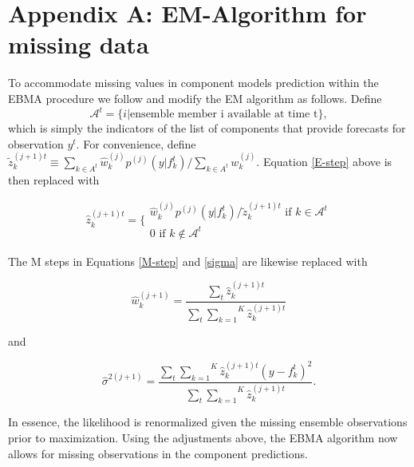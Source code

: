 \documentclass[12pt,fullpage,endnotes]{article}
\begin{document}
 \section*{Appendix A: EM-Algorithm for missing data}

To accommodate missing values in component models prediction within
the EBMA procedure we follow \citet{Fraley:2010} and modify the EM
algorithm as follows.  Define $$\mathcal{A}^t = \{i|\mbox{ensemble
  member i available at time t}\},$$\noindent which is simply the
indicators of the list of components that provide forecasts for
observation $y^t$.  For convenience, define $\tilde{z}_k^{(j+1)t}
\equiv {{\underset{k \in
      A^t}{\sum}}\hat{w}^{(j)}_kp^{(j)}(y|f_{k}^{t})}/{\underset{k \in
    A^t}\sum w_k^{(j)}}$.  Equation \ref{E-step} above is then
replaced with

\begin{equation}
\hat{z}^{(j+1)t}_{k} = \Bigg\{ \begin{array}{c} {\hat{w}^{(j)}_k p^{(j)}(y|f_{k}^{t})}/{\tilde{z}_k^{(j+1)t} } \mbox{ if } k \in \mathcal{A}^t\\ 0 \mbox{ if } k \notin \mathcal{A}^t \end{array}
\end{equation}



\noindent  The M steps in Equations \ref{M-step} and \ref{sigma} are likewise replaced with

\begin{equation}
\hat{w}^{(j+1)}_k=\frac{\underset{t}{\sum}\hat{z}^{(j+1)t}_{k}}{\underset{t}{\sum}\overset{K}{\underset{k=1}{ \sum}} \hat{z}_k^{(j+1)t}}
\end{equation}


\noindent and

\begin{equation}
\hat{\sigma}^{2(j+1)}=\frac{\underset{t}{\sum}\overset{K}{\underset{k=1}{\sum}}\hat{z}^{(j+1)t}_{k}(y-f_{k}^{t})^2 }{\underset{t}{\sum}\overset{K}{\underset{k=1}{ \sum}} \hat{z}_k^{(j+1)t}}.
\end{equation}

\noindent In essence, the likelihood is renormalized given the missing
ensemble observations prior to maximization. Using the adjustments
above, the EBMA algorithm now allows for missing observations in the
component predictions.
\end{document}
